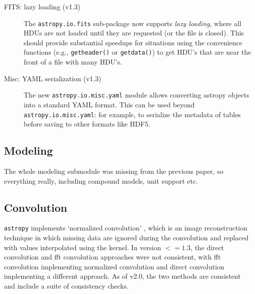 \documentclass[modern]{aastex61}
\newcommand{\package}[1]{\texttt{#1}\xspace}
\newcommand{\astropypkg}{\package{astropy}\xspace}
\begin{document}
\begin{description}
	\item [FITS: lazy loading (v1.3)]

		The \package{astropy.io.fits} sub-package now supports \emph{lazy
		loading}, where all HDUs are not loaded until they are requested (or
		the file is closed). This should provide substantial speedups for
		situations using the convenience functions (e.g., \texttt{getheader()}
		or \texttt{getdata()}) to get HDU’s that are near the front of a file
		with many HDU’s.

	\item [Misc: YAML serialization (v1.3)]

		The new \package{astropy.io.misc.yaml} module allows converting
		astropy objects into a standard YAML format.
        This can be used beyond \texttt{astropy.io.misc.yaml}: for example, to
        serialize the metadata of tables before saving to other formats like
        HDF5.

\end{description}

\subsection{Modeling}
\label{sec:modeling}
The whole modeling submodule was missing from the previous paper, so everything really, including compound models, unit support etc.

\subsection{Convolution}

\astropypkg implements `normalized convolution' \citep[e.g.,][]{Knutsson1993}, which is an image reconstruction technique in which missing data are ignored during the convolution and replaced with values interpolated using the kernel.   In version $<=1.3$, the direct convolution and fft convolution approaches were not consistent, with fft convolution implementing normalized convolution and direct convolution implementing a different approach.  As of v2.0, the two methods are consistent and include a suite of consistency checks.
\end{document}
